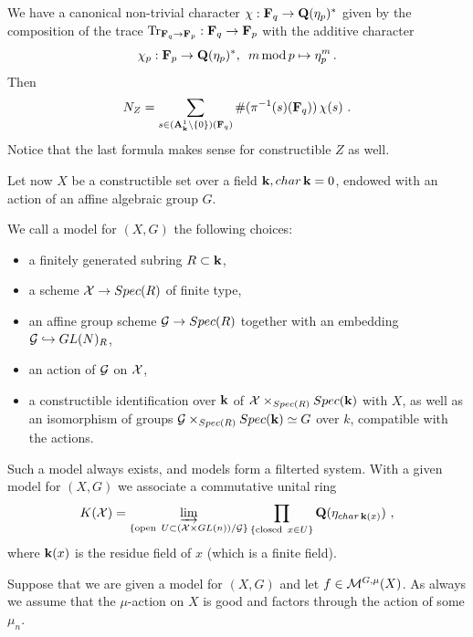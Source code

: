 \documentclass[12pt]{article}
\begin{document}
We have a canonical non-trivial character $\chi:{\bf F}_q\to {\bf Q}(\eta_p)^{\ast}$ given by the composition
of the trace $\operatorname{Tr}_{{\bf F}_q\to{\bf F}_p}:{\bf F}_q\to {\bf F}_p$ with the additive character
$$\chi_p:{\bf F}_p\to {\bf Q}(\eta_p)^{\ast}, \,\,\,m\operatorname{mod} p\mapsto \eta_p^m\,.$$
Then
$$N_Z=\sum_{s\in ({\bf A}^1_{{\bf k}}\setminus \{0\})({\bf F}_q)}\#(\pi^{-1}(s)({\bf F}_q))\,\chi(s)\,\,.$$
Notice that the last formula makes sense for constructible $Z$ as well.






Let now $X$ be a constructible set over a field ${\bf k}, char\,{\bf k}=0$, endowed with an action of an affine algebraic group $G$.




\begin{defn} We call a model for $(X,G)$ the following choices:
\begin{itemize}
 \item a finitely generated subring $R\subset {\bf k}$,
\item a scheme ${\cal X}\to Spec(R)$ of finite type,
\item an affine group scheme ${\cal G}\to Spec(R)$ together with an embedding ${\cal G}\hookrightarrow GL(N)_R$,
\item an action of ${\cal G}$ on ${\cal X}$,
\item a constructible identification over ${\bf k}$ of ${\cal X}\times_{Spec(R)}Spec({\bf k})$ with $X$, as well as an
isomorphism of groups ${\cal G}\times_{ Spec(R)}Spec({\bf k})\simeq G$ over $k$, compatible with the actions. 
\end{itemize}
\end{defn}
Such a model always exists, and models form a filterted system.
With a given model for $(X,G)$ we associate a commutative unital ring
$$K({\cal X})=\varinjlim_{\{\mathrm{open}\,\,\,U\subset ({\cal X}\times GL(n))/{\cal G}\}}\prod_{\{\mathrm{closed}\,\,\,x\in U\}}{\bf Q}(\eta_{char\, {\bf k}(x)})\,\,,$$
where ${\bf k}(x)$ is the residue field of $x$ (which is a finite field).

Suppose that we are given a model for $(X,G)$ and
let $f\in {\cal M}^{G,\mu}(X)$. As always we assume that the $\mu$-action on $X$ is good and factors through
the action of some $\mu_n$.
\end{document}
